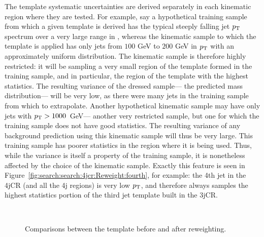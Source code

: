 The template systematic uncertainties are derived separately in each kinematic region where they are tested. For example, say a hypothetical training sample from which a given template is derived has the typical steeply falling jet $p_{\text{T}}$ spectrum over a very large range in \pT, whereas the kinematic sample to which the template is applied has only jets from $100$ GeV to $200$ GeV in $p_{\text{T}}$ with an approximately uniform distribution. The kinematic sample is therefore highly restricted: it will be sampling a very small region of the template formed in the training sample, and in particular, the region of the template with the highest statistics. The resulting variance of the dressed sample--- the predicted mass distribution--- will be very low, as there were many jets in the training sample from which to extrapolate. Another hypothetical kinematic sample may have only jets with $p_{\text{T}} > 1000$~GeV--- another very restricted sample, but one for which the training sample does not have good statistics. The resulting variance of any background prediction using this kinematic sample will thus be very large. This training sample has poorer statistics in the region where it is being used. Thus, while the variance is itself a property of the training sample, it is nonetheless affected by the choice of the kinematic sample. Exactly this feature is seen in Figure~\ref{fig:search:search:4jcr:Reweight:fourth}, for example: the 4th jet in the 4jCR (and all the 4j regions) is very low $p_{\text{T}}$, and therefore always samples the highest statistics portion of the third jet template built in the 3jCR. 

\begin{figure}[!ht]
  \centering
  
  \\
    
  \caption{Comparisons between the template before and after reweighting.}
           
           
  \label{fig:search:search:4jcr:Reweight}
\end{figure}
%


